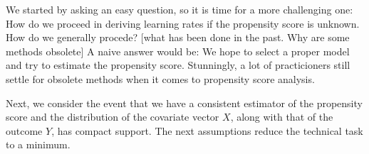 We started by asking an easy question, so it is time for a more challenging one: How do we proceed in deriving learning rates if the propensity score is unknown.
How do we generally procede?
[what has been done in the past. Why are some methods obsolete]
A naive answer would be: We hope to select a proper model and try to estimate the propensity score.
Stunningly, a lot of practicioners still settle for obsolete methods when it comes to propensity score analysis.


Next, we consider the event that we have a consistent estimator of the 
propensity score and the distribution of the covariate vector $X$, 
along with that of the outcome $Y$, 
has compact support.
The next assumptions reduce the technical task to a minimum.

